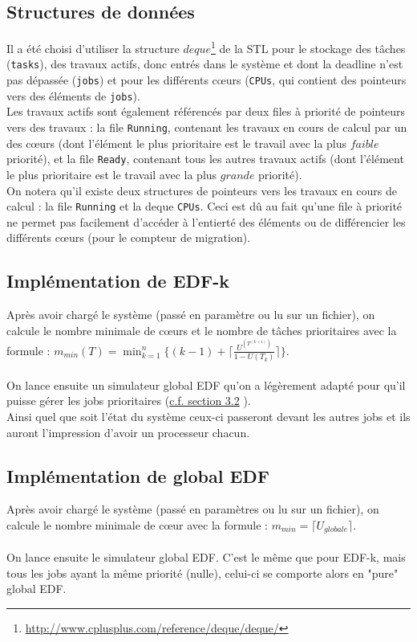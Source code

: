\documentclass[a4paper,10pt]{article}
\begin{document}
	\subsection{Structures de données}
		Il a été choisi d'utiliser la structure $deque$\footnote{\url{http://www.cplusplus.com/reference/deque/deque/}} de la STL pour le stockage des 				tâches (\verb?tasks?), des travaux actifs, donc entrés dans le système et dont la deadline n'est pas dépassée (\verb?jobs?) et pour les différents 			cœurs (\verb?CPUs?, qui contient des pointeurs vers des éléments de \verb?jobs?).\\

		Les travaux actifs sont également référencés par deux files à priorité de pointeurs vers des travaux : la file \verb?Running?, contenant les 				travaux en cours de calcul par un des cœurs (dont l'élément le plus prioritaire est le travail avec la plus $faible$ priorité), et la file 					\verb?Ready?, contenant tous les autres travaux actifs (dont l'élément le plus prioritaire est le travail avec la plus $grande$ priorité).\\

		On notera qu'il existe deux structures de pointeurs vers les travaux en cours de calcul : la file \verb?Running? et la deque \verb?CPUs?. Ceci est 			dû au fait qu'une file à priorité ne permet pas facilement d'accéder à l'entierté des éléments ou de différencier les différents cœurs (pour le 			compteur de migration).
		
		
	\subsection{Implémentation de EDF-k}
		Après avoir chargé le système (passé en paramètre ou lu sur un fichier), on calcule le nombre minimale de cœurs et le nombre de tâches prioritaires avec la formule : $ m_{min}(T) = \min_{k=1}^n \{  (k-1) + \lceil \frac{U^{(T^{(k+1)})}}{1- U(T_k)}  \rceil \} $.\\
		~\\
		On lance ensuite un simulateur global EDF qu'on a légèrement adapté pour qu'il puisse gérer les jobs prioritaires (\hyperlink{prioriteEDFk}{c.f. section 3.2} ).\\
		Ainsi quel que soit l'état du système ceux-ci passeront devant les autres jobs et ils auront l'impression d'avoir un processeur chacun.
		
	\subsection{Implémentation de global EDF}
		Après avoir chargé le système (passé en paramètres ou lu sur un fichier), on calcule le nombre minimale de cœur avec la formule : $ m_{min} =\lceil 		U_{globale} \rceil$.\\
		~\\
		On lance ensuite le simulateur global EDF. C'est le même que pour EDF-k, mais tous les jobs ayant la même priorité (nulle), celui-ci se comporte alors en "pure" global EDF.
\end{document}
